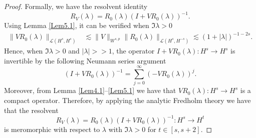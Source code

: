 \documentclass[reqno, 12pt]{amsart}
\numberwithin{equation}{section}
\begin{document}
\begin{proof}
 Formally, we have the resolvent identity 
 \[
 R_{ V}(\lambda) = R_0(\lambda) (I  + VR_0(\lambda))^{-1}.
 \]
 Using Lemma \ref{Lem5.1}, it can be verified when $\Im \lambda>0$ \begin{align*}
 \| V  R_0(\lambda) \|_{\mathcal{L}(H^{s},H^{s})} &\lesssim \|V\|_{W^{s,p}}\| R_0(\lambda) \|_{\mathcal{L}(H^{s},H^{-s})}  \lesssim (1+|\lambda|)^{-1-2s}.
 \end{align*} Hence, when $\Im \lambda>0$ and $|\lambda| >>1$, the operator $I   + VR_0(\lambda) : H^s \to H^s$ is invertible by the following Neumann series argument \[
 (I +  VR_0(\lambda))^{-1}=\sum_{j=0}^\infty (-VR_0(\lambda))^j.
 \] Moreover, from Lemma \ref{Lem4.1}--\ref{Lem5.1} we have that $ VR_0(\lambda) : H^s \to H^s$ is a compact operator. Therefore, by applying the analytic Fredholm theory \cite[Theorem C.8]{dyatlov2019mathematical} we have that the resolvent \[
 R_{ V}(\lambda) = R_0(\lambda) (I +   VR_0(\lambda))^{-1} : H^s \to H^t
 \] is meromorphic with respect to $\lambda$ with $\Im \lambda>0$ for $t \in [s,s+2]$.
 

\end{proof}
\end{document}
